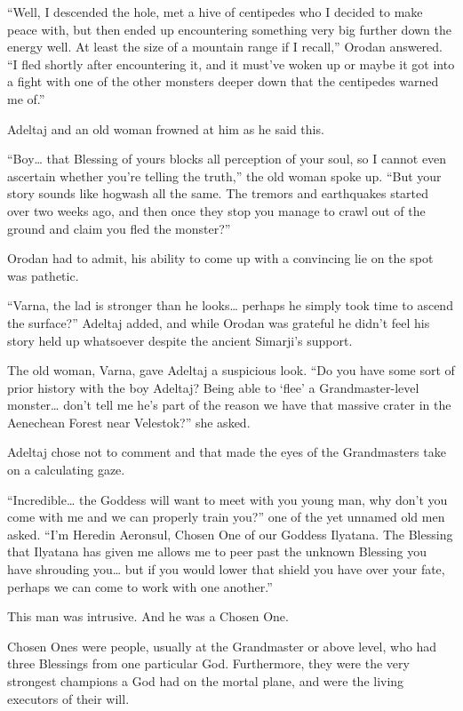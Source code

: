 \documentclass[a4paper,10pt]{book}
\begin{document}
“Well, I descended the hole, met a hive of centipedes who I decided to make peace with, but then ended up encountering something very big further down the energy well. At least the size of a mountain range if I recall,” Orodan answered. “I fled shortly after encountering it, and it must’ve woken up or maybe it got into a fight with one of the other monsters deeper down that the centipedes warned me of.”\par
Adeltaj and an old woman frowned at him as he said this.\par
“Boy… that Blessing of yours blocks all perception of your soul, so I cannot even ascertain whether you’re telling the truth,” the old woman spoke up. “But your story sounds like hogwash all the same. The tremors and earthquakes started over two weeks ago, and then once they stop you manage to crawl out of the ground and claim you fled the monster?”\par
Orodan had to admit, his ability to come up with a convincing lie on the spot was pathetic.\par
“Varna, the lad is stronger than he looks… perhaps he simply took time to ascend the surface?” Adeltaj added, and while Orodan was grateful he didn’t feel his story held up whatsoever despite the ancient Simarji’s support.\par
The old woman, Varna, gave Adeltaj a suspicious look. “Do you have some sort of prior history with the boy Adeltaj? Being able to ‘flee’ a Grandmaster-level monster… don’t tell me he’s part of the reason we have that massive crater in the Aenechean Forest near Velestok?” she asked.\par
Adeltaj chose not to comment and that made the eyes of the Grandmasters take on a calculating gaze.\par
“Incredible… the Goddess will want to meet with you young man, why don’t you come with me and we can properly train you?” one of the yet unnamed old men asked. “I’m Heredin Aeronsul, Chosen One of our Goddess Ilyatana. The Blessing that Ilyatana has given me allows me to peer past the unknown Blessing you have shrouding you… but if you would lower that shield you have over your fate, perhaps we can come to work with one another.”\par
This man was intrusive. And he was a Chosen One.\par
Chosen Ones were people, usually at the Grandmaster or above level, who had three Blessings from one particular God. Furthermore, they were the very strongest champions a God had on the mortal plane, and were the living executors of their will.\par
\end{document}
